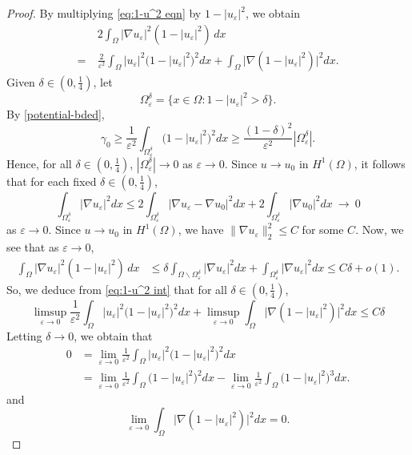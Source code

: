 \documentclass[a4paper,10pt,reqno]{amsart}
\theoremstyle{definition}
\newcommand{\ga}{{\gamma}}
\newcommand{\ve}{{\varepsilon}}
\newcommand{\Om}{{\Omega}}
\numberwithin{equation}{section}
\begin{document}
\begin{proof}
 By multiplying \eqref{eq:1-u^2 eqn} by $1-|u_\ve|^2$, we obtain
 \begin{equation}\label{eq:1-u^2 int}
\begin{aligned}
& 2 \int_\Om |\nabla u_\ve|^2 (1-|u_\ve|^2)\, dx\\
=~& \frac{2}{\ve^2} \int_\Om |u_\ve|^2 \big(1-|u_\ve|^2 \big)^2 dx + \int_\Om \big| \nabla (1-|u_\ve|^2 )\big|^2 dx  .
\end{aligned}
\end{equation}
Given $\delta \in (0,\frac14)$, let
\[ \Om_\ve^\delta = \{ x \in \Om :   1-|u_\ve|^2 >\delta \}.
\]
By \eqref{potential-bded},
\[ \ga_0 \ge \frac{1}{\ve^2} \int_{ \Om_\ve^\delta}  \big( 1- |u_\ve|^2\big)^2 dx \ge  \frac{(1-\delta)^2}{\ve^2}  | \Om_\ve^\delta|.
\]
Hence, for all  $\delta \in (0,\frac14)$, $ | \Om_\ve^\delta| \to 0$   as $\ve\to 0$.
Since $u\to u_0$ in $H^1(\Om)$, it follows that for each fixed  $\delta \in (0,\frac14)$,
\[ \int_{ \Om_\ve^\delta}  |\nabla u_\ve|^2 dx \le 2 \int_{ \Om_\ve^\delta}  |\nabla u_\ve - \nabla u_0 |^2 dx + 2  \int_{ \Om_\ve^\delta}  | \nabla u_0 |^2 dx ~ \to ~ 0
\]
as $\ve \to 0$.
Since $u\to u_0$ in $H^1(\Om)$, we have $\|\nabla u_\ve\|_2^2 \le C$ for some $C$.
Now, we see that  as $\ve \to 0$,
\begin{align*}
  \int_\Om |\nabla u_\ve|^2 (1-|u_\ve|^2)\, dx & \le  \delta  \int_{ \Om \backslash \Om_\ve^\delta} |\nabla u_\ve|^2 dx +  \int_{     \Om_\ve^\delta} |\nabla u_\ve|^2 dx \le C \delta  +o(1).
\end{align*}
So, we deduce from \eqref{eq:1-u^2 int} that for all  $\delta \in (0,\frac14)$,
\[ \limsup_{\ve \to 0} \frac{1}{\ve^2} \int_\Om |u_\ve|^2 \big(1-|u_\ve|^2 \big)^2 dx +\limsup_{\ve \to 0} \int_\Om \big| \nabla (1-|u_\ve|^2 )\big|^2 dx \le C  \delta
\]
Letting $\delta  \to 0$, we obtain that
\begin{equation}\label{eq:(1-u^2)^2 vs (1-u^2)^3}
\begin{aligned}
0&= \lim_{\ve \to 0} \frac{1}{\ve^2} \int_\Om |u_\ve|^2 \big(1-|u_\ve|^2 \big)^2 dx \\
&  = \lim_{\ve \to 0} \frac{1}{\ve^2} \int_\Om  \big(1-|u_\ve|^2 \big)^2 dx - \lim_{\ve \to 0} \frac{1}{\ve^2} \int_\Om   \big(1-|u_\ve|^2 \big)^3 dx.
\end{aligned}
\end{equation}
and
\begin{equation}\label{eq:nabla 1-u^2}
\lim_{\ve \to 0} \int_\Om \big| \nabla (1-|u_\ve|^2 )\big|^2 dx =0.
\end{equation}

\end{proof}
\end{document}
